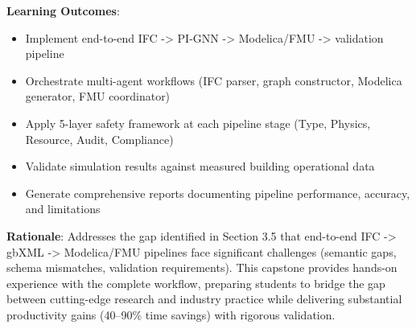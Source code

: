 \documentclass[12pt,a4paper]{article}
\begin{document}
\textbf{Learning Outcomes}:
\begin{itemize}
  \item Implement end-to-end IFC -> PI-GNN -> Modelica/FMU -> validation pipeline
  \item Orchestrate multi-agent workflows (IFC parser, graph constructor, Modelica generator, FMU coordinator)
  \item Apply 5-layer safety framework at each pipeline stage (Type, Physics, Resource, Audit, Compliance)
  \item Validate simulation results against measured building operational data
  \item Generate comprehensive reports documenting pipeline performance, accuracy, and limitations
\end{itemize}
\textbf{Rationale}: Addresses the gap identified in Section 3.5 that end-to-end IFC -> gbXML -> Modelica/FMU pipelines face significant challenges (semantic gaps, schema mismatches, validation requirements). This capstone provides hands-on experience with the complete workflow, preparing students to bridge the gap between cutting-edge research and industry practice while delivering substantial productivity gains (40--90\% time savings) with rigorous validation.
\end{document}
